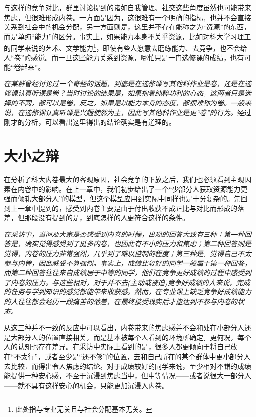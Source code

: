 \documentclass[UTF8,a4paper,fontset=windows,11pt,openany]{ctexbook}
\begin{document}
与这样的竞争对比，群里讨论提到的诸如自我管理、社交这些角度虽然也可能带来焦虑，但很难形成内卷。一方面是因为，这很难有一个明确的指标，也并不会直接关系到社会中的机会分配，另一方面则是，这里并不存在能称之为“资源”的东西，而是单纯“能力”的区分。事实上，如果能力本身不关乎资源，比如对科大学习理工的同学来说的艺术、文学能力\footnote{此处指与专业无关且与社会分配基本无关。}，即使有些人愿意去磨练能力、去竞争，也不会给人“卷”的感觉。而一旦这些能力关系到资源，哪怕只是一门选修课的成绩，也有可能“卷起来”。

\emph{在某群曾经讨论过一个奇怪的话题，到底是在选修课写其他科作业是卷，还是在选修课认真听课是卷？当时讨论的结果是，如果抱着纯粹功利的心态，这两者只是选择的不同，都可以是卷，反之，如果是以能力本身的态度，都很难称为卷。一般来说，在选修课认真听课是兴趣使然为主，因此写其他科作业是更“卷”的行为。}经过刚才的分析，可以看出这里得出的结论确实是有道理的。

\section{大小之辩}

在分析了科大内卷最大的客观原因，社会竞争的下放之后，我们也必须看到主观因素在内卷中的影响。在上一章中，我们初步给出了一个“少部分人获取资源能力更强而倾轧大部分人”的模型，但这个模型应用到实际中同样也是十分复杂的。先回到上一章中提到的，感受到内卷主要是由于付出收获不成正比与对比而形成的落差，但那段没有提到的是，到底怎样的人更符合这样的条件。

\emph{在采访中，当问及大家是否感受到内卷的时候，出现的回答大致有三种：第一种回答是，确实觉得感受到了挺多内卷，也因此有不小的压力和焦虑；第二种回答则是觉得，内卷的压力非常强烈，几乎到了难以控制的程度；第三种是，觉得自己不太参与内卷，因此感受不算强烈。事实上，成绩比较好的同学一般属于第一种回答，而第二种回答往往来自成绩居于中等的同学，他们在竞争更好成绩的过程中感受到了内卷的压力。与这些相对，对于并不去(主动或被迫)竞争好成绩的人来说，完成的任务与学到知识的感觉都能带来收获感。然而，在专业课上缺乏竞争好成绩能力的人往往都会经历一段痛苦的落差，在最终接受现实后才能达到不参与内卷的状态。}

从这三种并不一致的反应中可以看出，内卷带来的焦虑感并不会和处在小部分人还是大部分人的位置直接相关，而是基本被每个人看到的环境所确定，更何况，每个人的认知也存在差异。在采访中实际上看到的是，很多人都更倾向于将自己放在“不太行”，或者至少是“还不够”的位置，去和自己所在的某个群体中更小部分人去比较，而得出令人焦虑的结论。对于成绩较好的同学来说，至少相对不错的成绩能提供一种安心感，不至于沉浸到焦虑当中，但中等情况——或者说很大一部分人——就不具有这样安心的机会，只能更加沉浸入内卷。
\end{document}
